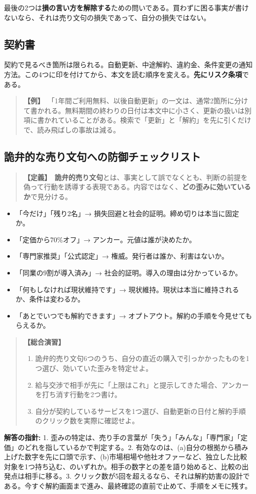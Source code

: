 \documentclass{article}
\begin{document}
最後の2つは\textbf{損の言い方を解除する}ための問いである。買わずに困る事実が書けないなら、それは売り文句の損失であって、自分の損失ではない。

\subsection{契約書}

契約で見るべき箇所は限られる。自動更新、中途解約、違約金、条件変更の通知方法。この4つに印を付けてから、本文を読む順序を変える。\textbf{先にリスク条項}である。

\begin{quote}
\textbf{【例】}\ 「1年間ご利用無料、以後自動更新」の一文は、通常2箇所に分けて書かれる。無料期間の終わりの日付は本文中に小さく、更新の扱いは別項に書かれていることがある。検索で「更新」と「解約」を先に引くだけで、読み飛ばしの事故は減る。
\end{quote}

\subsection{詭弁的な売り文句への防御チェックリスト}

\begin{quote}
\textbf{【定義】}\ \textbf{詭弁的売り文句}とは、事実として誤でなくとも、判断の前提を偽って行動を誘導する表現である。内容ではなく、\textbf{どの歪みに効いているか}で見分ける。
\end{quote}

\begin{itemize}
\item 「今だけ」「残り2名」→ 損失回避と社会的証明。締め切りは本当に固定か。
\item 「定価から70\%オフ」→ アンカー。元値は誰が決めたか。
\item 「専門家推奨」「公式認定」→ 権威。発行者は誰か、利害はないか。
\item 「同業の9割が導入済み」→ 社会的証明。導入の理由は分かっているか。
\item 「何もしなければ現状維持です」→ 現状維持。現状は本当に維持されるか、条件は変わるか。
\item 「あとでいつでも解約できます」→ オプトアウト。解約の手順を今見せてもらえるか。
\end{itemize}

\begin{quote}
\textbf{【総合演習】}
\begin{enumerate}
\item 詭弁的売り文句6つのうち、自分の直近の購入で引っかかったものを1つ選び、効いていた歪みを特定せよ。
\item 給与交渉で相手が先に「上限はこれ」と提示してきた場合、アンカーを打ち消す行動を2つ書け。
\item 自分が契約しているサービスを1つ選び、自動更新の日付と解約手順のクリック数を実際に確認せよ。
\end{enumerate}
\end{quote}

\textbf{解答の指針:} 1. 歪みの特定は、売り手の言葉が「失う」「みんな」「専門家」「定価」のどれを指しているかで判定する。2. 有効なのは、(a)自分の根拠から積み上げた数字を先に口頭で示す、(b)市場相場や他社オファーなど、独立した比較対象を1つ持ち込む、のいずれか。相手の数字との差を語り始めると、比較の出発点は相手に移る。3. クリック数が5回を超えるなら、それは解約妨害の設計である。今すぐ解約画面まで進み、最終確認の直前で止めて、手順をメモに残す。
\end{document}
